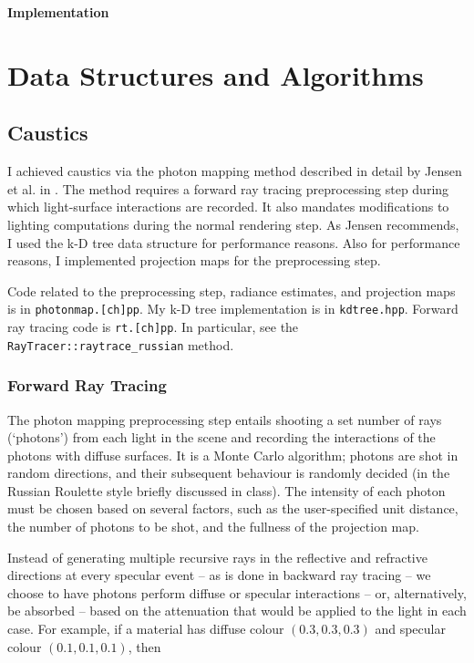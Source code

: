 \documentclass{article}
\begin{document}
\begin{center}{\bf \LARGE Implementation}\end{center}

\tableofcontents

\section{Data Structures and Algorithms}

\subsection{Caustics}

I achieved caustics via the photon mapping method described in detail by Jensen
et al. in
\cite{coursenotes}. The method requires a forward ray tracing preprocessing
step during which light-surface interactions are recorded. It also mandates
modifications to lighting computations during the normal rendering step. As
Jensen recommends, I used the k-D tree data structure for performance reasons.
Also for performance reasons, I implemented projection maps for the
preprocessing step.

Code related to the preprocessing step, radiance estimates, and projection maps
is in {\tt photonmap.[ch]pp}. My k-D tree implementation is in {\tt kdtree.hpp}.
Forward ray tracing code is {\tt rt.[ch]pp}. In particular, see the {\tt
RayTracer::raytrace\_russian} method.

\subsubsection{Forward Ray Tracing}

The photon mapping preprocessing step entails shooting a set number of rays
(`photons') from each light in the scene and recording the interactions of the
photons with diffuse surfaces. It is a Monte Carlo algorithm; photons are shot
in random directions, and their subsequent behaviour is randomly decided (in the
Russian Roulette style briefly discussed in class). The intensity of each photon
must be chosen based on several factors, such as the user-specified unit
distance, the number of photons to be shot, and the fullness of the projection
map.

Instead of generating multiple recursive rays in the reflective and refractive
directions at every specular event -- as is done in backward ray tracing
-- we choose to have photons perform diffuse or specular interactions -- or,
alternatively, be absorbed -- based on the
attenuation that would be applied to the light in each case. For example, if a
material has diffuse colour $(0.3, 0.3,
0.3)$ and specular colour $(0.1, 0.1, 0.1)$, then
\end{document}
